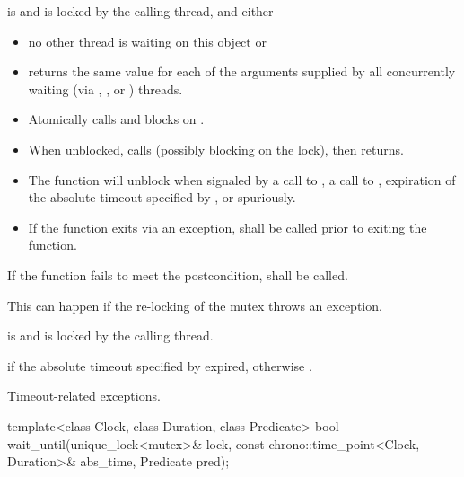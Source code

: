 \begin{itemdescr}
\pnum
\requires {} is  and 
is locked by the calling thread, and either
\begin{itemize}
\item no other thread is waiting on this  object or
\item {} returns the same value for each of the 
arguments supplied by all concurrently waiting (via ,
, or ) threads.
\end{itemize}

\pnum
\effects
\begin{itemize}
\item
Atomically calls  and blocks on .

\item
When unblocked, calls  (possibly blocking on the lock), then returns.

\item
The function will unblock when signaled by a call to , a call to ,
expiration of the absolute timeout specified by ,
or spuriously.

\item
If the function exits via an exception,  shall be called prior to exiting the function.
\end{itemize}

\pnum
\remarks
If the function fails to meet the postcondition, 
shall be called.
\begin{note} This can happen if the re-locking of the mutex throws an exception. \end{note}

\pnum
\postconditions {} is  and 
is locked by the calling thread.

\pnum
\returns {} if
the absolute timeout specified by  expired,
otherwise .

\pnum\throws Timeout-related
exceptions.

\end{itemdescr}

%
\begin{itemdecl}
template<class Clock, class Duration, class Predicate>
  bool wait_until(unique_lock<mutex>& lock,
                  const chrono::time_point<Clock, Duration>& abs_time,
                  Predicate pred);
\end{itemdecl}

